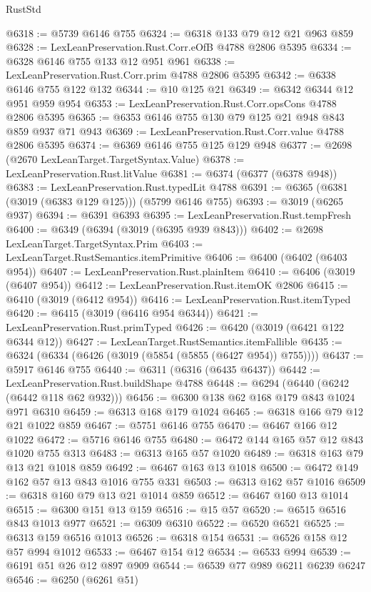 \begin{lexlean}{RustStd}
\begin{coremodule}
@6318 := @5739 @6146 @755
@6324 := @6318 @133 @79 @12 @21 @963 @859
@6328 := LexLeanPreservation.Rust.Corr.eOfB @4788 @2806 @5395
@6334 := @6328 @6146 @755 @133 @12 @951 @961
@6338 := LexLeanPreservation.Rust.Corr.prim @4788 @2806 @5395
@6342 := @6338 @6146 @755 @122 @132
@6344 := @10 @125 @21
@6349 := @6342 @6344 @12 @951 @959 @954
@6353 := LexLeanPreservation.Rust.Corr.opsCons @4788 @2806 @5395
@6365 := @6353 @6146 @755 @130 @79 @125 @21 @948 @843 @859 @937 @71 @943
@6369 := LexLeanPreservation.Rust.Corr.value @4788 @2806 @5395
@6374 := @6369 @6146 @755 @125 @129 @948
@6377 := @2698 (@2670 LexLeanTarget.TargetSyntax.Value)
@6378 := LexLeanPreservation.Rust.litValue
@6381 := @6374 (@6377 (@6378 @948))
@6383 := LexLeanPreservation.Rust.typedLit @4788
@6391 := @6365 (@6381 (@3019 (@6383 @129 @125))) (@5799 @6146 @755)
@6393 := @3019 (@6265 @937)
@6394 := @6391 @6393
@6395 := LexLeanPreservation.Rust.tempFresh
@6400 := @6349 (@6394 (@3019 (@6395 @939 @843)))
@6402 := @2698 LexLeanTarget.TargetSyntax.Prim
@6403 := LexLeanTarget.RustSemantics.itemPrimitive
@6406 := @6400 (@6402 (@6403 @954))
@6407 := LexLeanPreservation.Rust.plainItem
@6410 := @6406 (@3019 (@6407 @954))
@6412 := LexLeanPreservation.Rust.itemOK @2806
@6415 := @6410 (@3019 (@6412 @954))
@6416 := LexLeanPreservation.Rust.itemTyped
@6420 := @6415 (@3019 (@6416 @954 @6344))
@6421 := LexLeanPreservation.Rust.primTyped
@6426 := @6420 (@3019 (@6421 @122 @6344 @12))
@6427 := LexLeanTarget.RustSemantics.itemFallible
@6435 := @6324 (@6334 (@6426 (@3019 (@5854 (@5855 (@6427 @954)) @755))))
@6437 := @5917 @6146 @755
@6440 := @6311 (@6316 (@6435 @6437))
@6442 := LexLeanPreservation.Rust.buildShape @4788
@6448 := @6294 (@6440 (@6242 (@6442 @118 @62 @932)))
@6456 := @6300 @138 @62 @168 @179 @843 @1024 @971 @6310
@6459 := @6313 @168 @179 @1024
@6465 := @6318 @166 @79 @12 @21 @1022 @859
@6467 := @5751 @6146 @755
@6470 := @6467 @166 @12 @1022
@6472 := @5716 @6146 @755
@6480 := @6472 @144 @165 @57 @12 @843 @1020 @755 @313
@6483 := @6313 @165 @57 @1020
@6489 := @6318 @163 @79 @13 @21 @1018 @859
@6492 := @6467 @163 @13 @1018
@6500 := @6472 @149 @162 @57 @13 @843 @1016 @755 @331
@6503 := @6313 @162 @57 @1016
@6509 := @6318 @160 @79 @13 @21 @1014 @859
@6512 := @6467 @160 @13 @1014
@6515 := @6300 @151 @13 @159
@6516 := @15 @57
@6520 := @6515 @6516 @843 @1013 @977
@6521 := @6309 @6310
@6522 := @6520 @6521
@6525 := @6313 @159 @6516 @1013
@6526 := @6318 @154
@6531 := @6526 @158 @12 @57 @994 @1012
@6533 := @6467 @154 @12
@6534 := @6533 @994
@6539 := @6191 @51 @26 @12 @897 @909
@6544 := @6539 @77 @989 @6211 @6239 @6247
@6546 := @6250 (@6261 @51)

\end{coremodule}
\end{lexlean}
